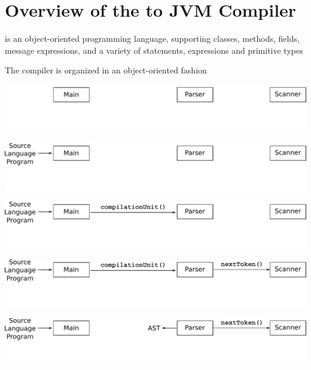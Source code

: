 \documentclass[8pt,a4paper,compress]{beamer}
\begin{document}
\section{Overview of the \protect \jmm to JVM Compiler}
\begin{frame}[fragile]
\pause

\jmm is an object-oriented programming language, supporting classes, methods, fields, message expressions, and a variety of statements, expressions and primitive types

\pause\bigskip

The \jmm compiler is organized in an object-oriented fashion

\bigskip

\begin{center}
\begin{overprint}
\includegraphics[scale=0.45]{figures/organization1.pdf}

\includegraphics[scale=0.45]{figures/organization2.pdf}

\includegraphics[scale=0.45]{figures/organization3.pdf}

\includegraphics[scale=0.45]{figures/organization4.pdf}

\includegraphics[scale=0.45]{figures/organization5.pdf}


\end{overprint}
\end{center}
\end{frame}
\end{document}

